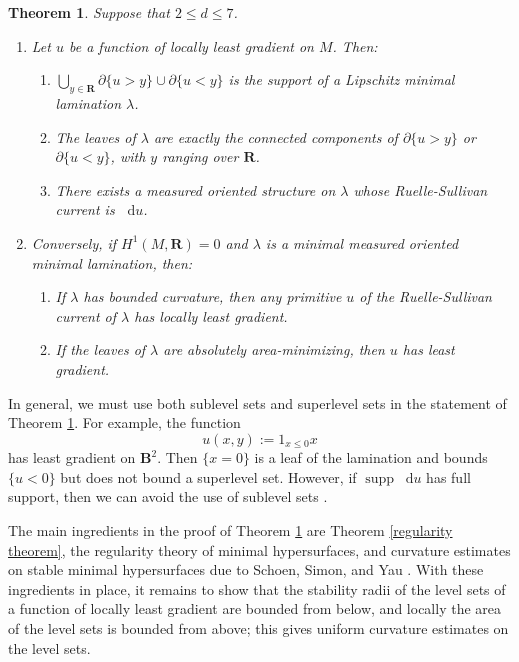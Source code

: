 \documentclass[reqno,11pt]{amsart}
\newcommand{\RR}{\mathbf{R}}
\newcommand{\Ball}{\mathbf{B}}
\newcommand*\dif{\mathop{}\!\mathrm{d}}
\DeclareMathOperator{\supp}{supp}
\newtheorem{mainthm}{Theorem}
\theoremstyle{definition}
\numberwithin{equation}{section}
\begin{document}
\begin{mainthm}\label{main thm}
Suppose that $2 \leq d \leq 7$.
\begin{enumerate}
\item Let $u$ be a function of locally least gradient on $M$.
Then:
\begin{enumerate}
\item $\bigcup_{y \in \RR} \partial \{u > y\} \cup \partial \{u < y\}$ is the support of a Lipschitz minimal lamination $\lambda$.
\item The leaves of $\lambda$ are exactly the connected components of $\partial \{u > y\}$ or $\partial \{u < y\}$, with $y$ ranging over $\RR$.
\item There exists a measured oriented structure on $\lambda$ whose Ruelle-Sullivan current is $\dif u$.
\end{enumerate}
\item Conversely, if $H^1(M, \RR) = 0$ and $\lambda$ is a minimal measured oriented minimal lamination, then:
\begin{enumerate}
\item If $\lambda$ has bounded curvature, then any primitive $u$ of the Ruelle-Sullivan current of $\lambda$ has locally least gradient.
\item If the leaves of $\lambda$ are absolutely area-minimizing, then $u$ has least gradient.
\end{enumerate}
\end{enumerate}
\end{mainthm}

In general, we must use both sublevel sets and superlevel sets in the statement of Theorem \ref{main thm}.
For example, the function
$$u(x, y) := 1_{x \leq 0} x$$
has least gradient on $\Ball^2$.
Then $\{x = 0\}$ is a leaf of the lamination and bounds $\{u < 0\}$ but does not bound a superlevel set.
However, if $\supp \dif u$ has full support, then we can avoid the use of sublevel sets \cite[Lemma 2.11]{górny2018}.

The main ingredients in the proof of Theorem \ref{main thm} are Theorem \ref{regularity theorem}, the regularity theory of minimal hypersurfaces, and curvature estimates on stable minimal hypersurfaces due to Schoen, Simon, and Yau \cite{Schoen75,Schoen81}.
With these ingredients in place, it remains to show that the stability radii of the level sets of a function of locally least gradient are bounded from below, and locally the area of the level sets is bounded from above; this gives uniform curvature estimates on the level sets.
\end{document}
